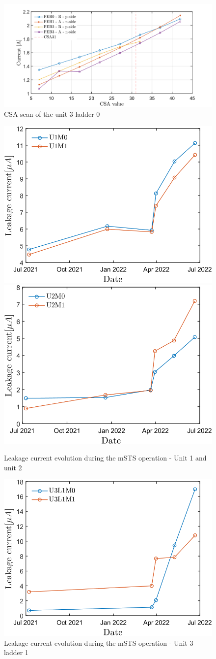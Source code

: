 \begin{figure}[h!]
\centering
\includegraphics[width=0.9\columnwidth]{Chapter6/DCS/images/U3L1CSABIAS.png}
\caption{CSA scan of the unit 3 ladder 0}
\label{U3L1CSABIAS}
\end{figure}


\begin{figure}[h!]
\centering
\includegraphics[width=0.45\columnwidth]{Chapter6/DCS/images/sensors/U1_leakage.png}
\includegraphics[width=0.45\columnwidth]{Chapter6/DCS/images/sensors/U2_leakage.png}
\caption{Leakage current evolution during the mSTS operation - Unit 1 and unit 2}
\label{leakage_current_u1u2}
\end{figure}

\begin{figure}[h!]
\centering
\includegraphics[width=0.55\columnwidth]{Chapter6/DCS/images/sensors/U3L1_leakage.png}
\caption{Leakage current evolution during the mSTS operation - Unit 3 ladder 1}
\label{leakage_current_u3l1}
\end{figure}





